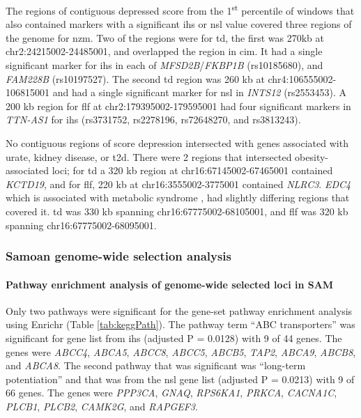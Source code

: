 \documentclass[twoside,openright]{report}
\let\oldparagraph\paragraph
\renewcommand{\paragraph}[1]{\oldparagraph{#1}\mbox{}}
\begin{document}
The regions of contiguous depressed score from the 1\textsuperscript{st}
percentile of windows that also contained markers with a significant
\gls{ihs} or \gls{nsl} value covered three regions of the genome for
\gls{nzm}. Two of the regions were for \gls{td}, the first was 270kb at
chr2:24215002-24485001, and overlapped the region in \gls{cim}. It had a
single significant marker for \gls{ihs} in each of
\emph{MFSD2B}/\emph{FKBP1B} (rs10185680), and \emph{FAM228B}
(rs10197527). The second \gls{td} region was 260 kb at
chr4:106555002-106815001 and had a single significant marker for
\gls{nsl} in \emph{INTS12} (rs2553453). A 200 kb region for \gls{flf} at
chr2:179395002-179595001 had four significant markers in \emph{TTN-AS1}
for \gls{ihs} (rs3731752, rs2278196, rs72648270, and rs3813243).

No contiguous regions of score depression intersected with genes
associated with urate, kidney disease, or \gls{t2d}. There were 2
regions that intersected obesity-associated loci; for \gls{td} a 320 kb
region at chr16:67145002-67465001 contained \emph{KCTD19}, and for
\gls{flf}, 220 kb at chr16:3555002-3775001 contained \emph{NLRC3}.
\emph{EDC4} which is associated with metabolic syndrome
\citep{kristiansson2012genome}, had slightly differing regions that
covered it. \Gls{td} was 330 kb spanning chr16:67775002-68105001, and
\gls{flf} was 320 kb spanning chr16:67775002-68095001.

\subsubsection{Samoan genome-wide selection
analysis}\label{samoan-genome-wide-selection-analysis}

\paragraph{Pathway enrichment analysis of genome-wide selected loci in
SAM}\label{samPath}

Only two pathways were significant for the gene-set pathway enrichment
analysis using Enrichr (Table \ref{tab:keggPath}). The pathway term
``ABC transporters'' was significant for gene list from \gls{ihs}
(adjusted P = 0.0128) with 9 of 44 genes. The genes were \emph{ABCC4},
\emph{ABCA5}, \emph{ABCC8}, \emph{ABCC5}, \emph{ABCB5}, \emph{TAP2},
\emph{ABCA9}, \emph{ABCB8}, and \emph{ABCA8}. The second pathway that
was significant was ``long-term potentiation'' and that was from the
\gls{nsl} gene list (adjusted P = 0.0213) with 9 of 66 genes. The genes
were \emph{PPP3CA}, \emph{GNAQ}, \emph{RPS6KA1}, \emph{PRKCA},
\emph{CACNA1C}, \emph{PLCB1}, \emph{PLCB2}, \emph{CAMK2G}, and
\emph{RAPGEF3}.
\end{document}
